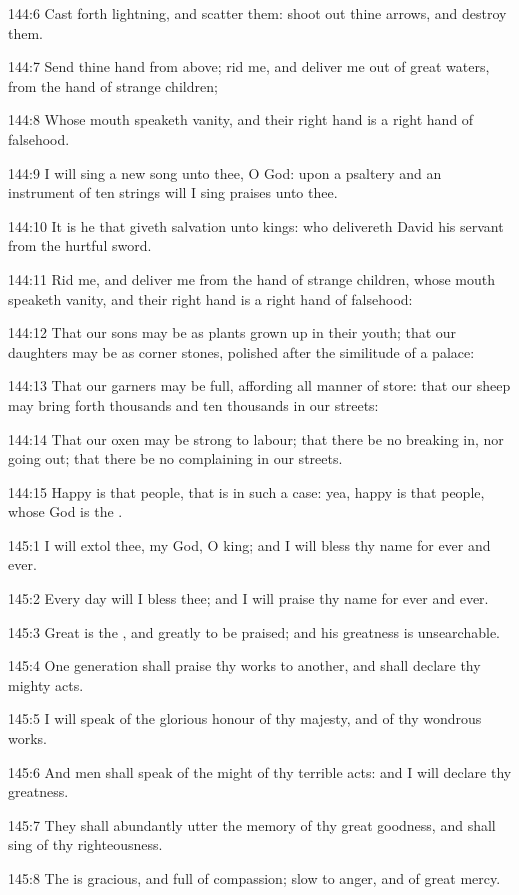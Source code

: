 144:6 Cast forth lightning, and scatter them: shoot out thine arrows,
and destroy them.

144:7 Send thine hand from above; rid me, and deliver me out of great
waters, from the hand of strange children;

144:8 Whose mouth speaketh vanity, and their right hand is a right
hand of falsehood.

144:9 I will sing a new song unto thee, O God: upon a psaltery and an
instrument of ten strings will I sing praises unto thee.

144:10 It is he that giveth salvation unto kings: who delivereth David
his servant from the hurtful sword.

144:11 Rid me, and deliver me from the hand of strange children, whose
mouth speaketh vanity, and their right hand is a right hand of
falsehood:

144:12 That our sons may be as plants grown up in their youth; that
our daughters may be as corner stones, polished after the similitude
of a palace:

144:13 That our garners may be full, affording all manner of store:
that our sheep may bring forth thousands and ten thousands in our
streets:

144:14 That our oxen may be strong to labour; that there be no
breaking in, nor going out; that there be no complaining in our
streets.

144:15 Happy is that people, that is in such a case: yea, happy is
that people, whose God is the \LORD.



145:1 I will extol thee, my God, O king; and I will bless thy name for
ever and ever.

145:2 Every day will I bless thee; and I will praise thy name for ever
and ever.

145:3 Great is the \LORD, and greatly to be praised; and his greatness
is unsearchable.

145:4 One generation shall praise thy works to another, and shall
declare thy mighty acts.

145:5 I will speak of the glorious honour of thy majesty, and of thy
wondrous works.

145:6 And men shall speak of the might of thy terrible acts: and I
will declare thy greatness.

145:7 They shall abundantly utter the memory of thy great goodness,
and shall sing of thy righteousness.

145:8 The \LORD is gracious, and full of compassion; slow to anger, and
of great mercy.

